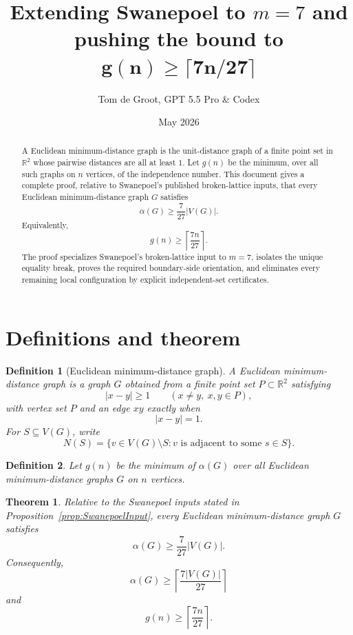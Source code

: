 \documentclass[11pt]{article}
\title{Extending Swanepoel to $m=7$ and pushing the bound to\\ $\boldsymbol{g(n)\ge \lceil 7n/27\rceil}$}
\author{Tom de Groot, GPT 5.5 Pro \& Codex}
\date{May 2026}
\theoremstyle{plain}
\newtheorem{theorem}{Theorem}
\newtheorem{definition}{Definition}
\numberwithin{equation}{section}
\newcommand{\RR}{\mathbb{R}}
\begin{document}
\maketitle

\begin{abstract}
A Euclidean minimum-distance graph is the unit-distance graph of a finite point set in $\RR^2$ whose pairwise distances are all at least $1$. Let $g(n)$ be the minimum, over all such graphs on $n$ vertices, of the independence number. This document gives a complete proof, relative to Swanepoel's published broken-lattice inputs, that every Euclidean minimum-distance graph $G$ satisfies
\[
  \alpha(G)\ge \frac{7}{27}|V(G)|.
\]
Equivalently,
\[
  g(n)\ge \left\lceil\frac{7n}{27}\right\rceil.
\]
The proof specializes Swanepoel's broken-lattice input to $m=7$, isolates the unique equality break, proves the required boundary-side orientation, and eliminates every remaining local configuration by explicit independent-set certificates.
\end{abstract}

\tableofcontents
\newpage

\section{Definitions and theorem}

\begin{definition}[Euclidean minimum-distance graph]
A Euclidean minimum-distance graph is a graph $G$ obtained from a finite point set $P\subset\RR^2$ satisfying
\[
 |x-y|\ge 1\qquad(x\ne y,\ x,y\in P),
\]
with vertex set $P$ and an edge $xy$ exactly when
\[
 |x-y|=1.
\]
For $S\subseteq V(G)$, write
\[
N(S)=\{v\in V(G)\setminus S: v\text{ is adjacent to some }s\in S\}.
\]
\end{definition}

\begin{definition}
Let $g(n)$ be the minimum of $\alpha(G)$ over all Euclidean minimum-distance graphs $G$ on $n$ vertices.
\end{definition}


\begin{theorem}\label{thm:main}
Relative to the Swanepoel inputs stated in Proposition~\ref{prop:SwanepoelInput}, every Euclidean minimum-distance graph $G$ satisfies
\[
  \alpha(G)\ge \frac{7}{27}|V(G)|.
\]
Consequently,
\[
  \alpha(G)\ge \left\lceil\frac{7|V(G)|}{27}\right\rceil
\]
and
\[
  g(n)\ge \left\lceil\frac{7n}{27}\right\rceil.
\]
\end{theorem}
\end{document}
